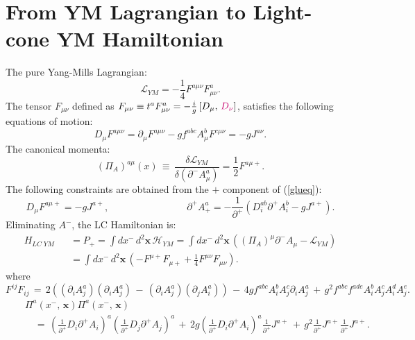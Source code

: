 \documentclass[a4paper,11pt]{article}
\begin{document}
\section{From YM Lagrangian to Light-cone YM Hamiltonian}\label{sec:app0}
The pure Yang-Mills Lagrangian:
\begin{equation}\label{eq:QCD}
\mathcal{L}_{YM}=-\frac{1}{4}F^{a\mu\nu}F_{\mu\nu}^{a}.
 \end{equation}
The tensor $F_{\mu\nu}$ defined as $F_{\mu\nu}\equiv t^{a}F_{\mu\nu}^{a}=-\frac{i}{g}\left[D_{\mu},\, {\color{chg}D_{\nu}}\right]$, 
satisfies the following equations of motion:
\begin{equation}\label{glueq}
D_{\mu}F^{a\mu\nu}=\partial_{\mu}F^{a\mu\nu}-gf^{abc}A_{\mu}^{b}F^{c\mu\nu}=-gJ^{a\nu}.
 \end{equation}
The canonical momenta:
\begin{equation}(\Pi_{A})^{a\mu}(x)\,\equiv\,\frac{\delta\mathcal{L}_{YM}}{\delta(\partial^{-}A_{\mu}^{a})}=\frac{1}{2}F^{a\mu+}.
\end{equation}
The following constraints are obtained from the $+$ component of (\ref{glueq}):\begin{equation}D_{\mu}F^{a\mu+}=-gJ^{a+},\qquad\qquad\qquad\qquad\partial^{+}A_{+}^{a}=-\frac{1}{\partial^{+}}(D_{i}^{ab}\partial^{+}A_{i}^{b}-gJ^{a+}).
\end{equation}
Eliminating $A^{-}$, the LC Hamiltonian is:
\begin{eqnarray}
H_{LC\; YM}&&=P_{+}=\int dx^{-}\, d^{2}\mathbf{x}\,\mathcal{H}_{YM}=\int dx^{-}\, d^{2}\mathbf{x}\,\left((\Pi_{A})^{\mu}\partial^{-}A_{\mu}-\mathcal{L}_{YM}\right)\nonumber\\
&&=\int dx^{-}\, d^{2}\mathbf{x}\,\left(-F^{\mu+}F_{\mu+}+\frac{1}{4}F^{\mu\nu}F_{\mu\nu}\right).
\end{eqnarray}
where
\begin{equation}F^{ij}F_{ij}\,=\,2\left((\partial_{i}A_{j}^{a})(\partial_{i}A_{j}^{a})\,-\,(\partial_{i}A_{j}^{a})(\partial_{j}A_{i}^{a})\right)\,-\,4gf^{abc}A_{i}^{b}A_{j}^{c}\partial_{i}A_{j}^{a}\,+\, g^{2}f^{abc}f^{ade}A_{i}^{b}A_{j}^{c}A_{i}^{d}A_{j}^{e}.
\end{equation}
\begin{eqnarray}
&&\Pi^{a}(x^{-},\, \mathbf{x})\Pi^{a}(x^{-},\, \mathbf{x})\\
&&\quad=\,\left(\frac{1}{\partial^{+}}D_{i}\partial^{+}A_{i}\right)^{a}\left(\frac{1}{\partial^{+}}D_{j}\partial^{+}A_{j}\right)^{a}\,+\,2g\left(\frac{1}{\partial^{+}}D_{i}\partial^{+}A_{i}\right)^{a}\frac{1}{\partial^{+}}J^{a+}\,+\, g^{2}\frac{1}{\partial^{+}}J^{a+}\frac{1}{\partial^{+}}J^{a+}.\nonumber
\end{eqnarray}
\end{document}
